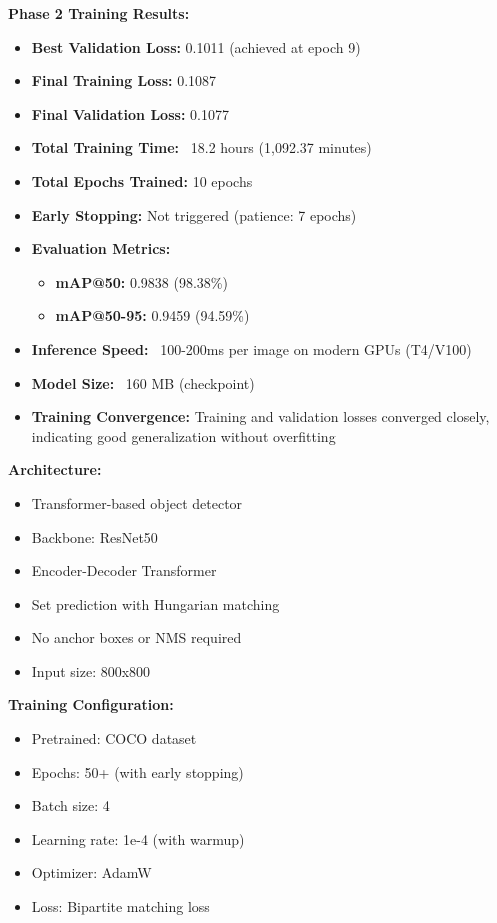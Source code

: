 \documentclass[12pt,a4paper]{article}
\begin{document}
\textbf{Phase 2 Training Results:}
\begin{itemize}
    \item \textbf{Best Validation Loss:} 0.1011 (achieved at epoch 9)
    \item \textbf{Final Training Loss:} 0.1087
    \item \textbf{Final Validation Loss:} 0.1077
    \item \textbf{Total Training Time:} ~18.2 hours (1,092.37 minutes)
    \item \textbf{Total Epochs Trained:} 10 epochs
    \item \textbf{Early Stopping:} Not triggered (patience: 7 epochs)
    \item \textbf{Evaluation Metrics:}
    \begin{itemize}
        \item \textbf{mAP@50:} 0.9838 (98.38\%)
        \item \textbf{mAP@50-95:} 0.9459 (94.59\%)
    \end{itemize}
    \item \textbf{Inference Speed:} ~100-200ms per image on modern GPUs (T4/V100)
    \item \textbf{Model Size:} ~160 MB (checkpoint)
    \item \textbf{Training Convergence:} Training and validation losses converged closely, indicating good generalization without overfitting
\end{itemize}

\textbf{Architecture:}
\begin{itemize}
    \item Transformer-based object detector
    \item Backbone: ResNet50
    \item Encoder-Decoder Transformer
    \item Set prediction with Hungarian matching
    \item No anchor boxes or NMS required
    \item Input size: 800x800
\end{itemize}

\textbf{Training Configuration:}
\begin{itemize}
    \item Pretrained: COCO dataset
    \item Epochs: 50+ (with early stopping)
    \item Batch size: 4
    \item Learning rate: 1e-4 (with warmup)
    \item Optimizer: AdamW
    \item Loss: Bipartite matching loss
\end{itemize}
\end{document}
